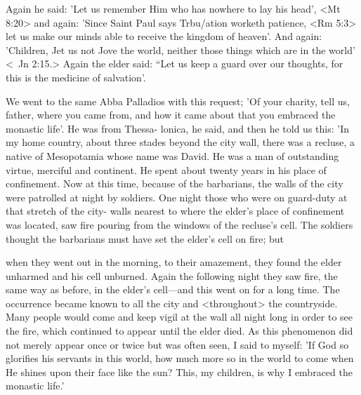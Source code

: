 Again he said: 'Let us remember Him who has nowhere to lay
his head', <Mt 8:20> and again: 'Since Saint Paul says Trbu/ation
worketh patience, <Rm 5:3> let us make our minds able to receive
the kingdom of heaven'. And again: 'Children, Jet us not Jove the
world, neither those things which are in the world' <\ Jn 2:15.>
Again the elder said: “Let us keep a guard over our thoughts, for
this is the medicine of salvation'.

We went to the same Abba Palladios with this request; 'Of your
charity, tell us, father, where you came from, and how it came
about that you embraced the monastic life'. He was from Thessa-
lonica, he said, and then he told us this: 'In my home country,
about three stades beyond the city wall, there was a recluse, a native
of Mesopotamia whose name was David. He was a man of
outstanding virtue, merciful and continent. He spent about twenty
years in his place of confinement. Now at this time, because of the
barbarians, the walls of the city were patrolled at night by soldiers.
One night those who were on guard-duty at that stretch of the city-
walls nearest to where the elder's place of confinement was located,
saw fire pouring from the windows of the recluse's cell. The soldiers
thought the barbarians must have set the elder's cell on fire; but

when they went out in the morning, to their amazement, they found
the elder unharmed and his cell unburned. Again the following night
they saw fire, the same way as before, in the elder's cell—and this
went on for a long time. The occurrence became known to all the
city and <throughout> the countryside. Many people would come
and keep vigil at the wall all night long in order to see the fire,
which continued to appear until the elder died. As this phenomenon
did not merely appear once or twice but was often seen, I said to
myself: 'If God so glorifies his servants in this world, how much
more so in the world to come when He shines upon their face like
the sun? This, my children, is why I embraced the monastic life.'

